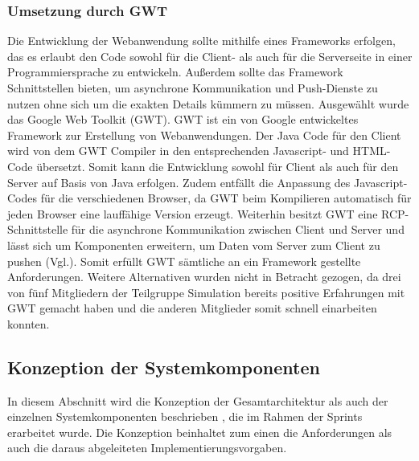 \subsubsection{Umsetzung durch GWT}
Die Entwicklung der Webanwendung sollte mithilfe eines Frameworks erfolgen, das es erlaubt den Code sowohl für die Client- als auch für die Serverseite in einer Programmiersprache zu entwickeln. Außerdem sollte das Framework Schnittstellen bieten, um asynchrone Kommunikation und Push-Dienste zu nutzen ohne sich um die exakten Details kümmern zu müssen. Ausgewählt wurde das Google Web Toolkit (GWT). GWT ist ein von Google entwickeltes Framework zur Erstellung von Webanwendungen. Der Java Code für den Client wird von dem GWT Compiler in den entsprechenden Javascript- und HTML-Code übersetzt. Somit kann die Entwicklung sowohl für Client als auch für den Server auf Basis von Java erfolgen. Zudem entfällt die Anpassung des Javascript-Codes für die verschiedenen Browser, da GWT beim Kompilieren automatisch für jeden Browser eine lauffähige Version erzeugt. Weiterhin besitzt GWT  eine RCP-Schnittstelle für die asynchrone Kommunikation zwischen Client und Server und lässt sich um Komponenten erweitern, um Daten vom Server zum Client zu pushen (Vgl.\cite{gwt}). Somit erfüllt GWT sämtliche an ein Framework gestellte Anforderungen. Weitere Alternativen wurden nicht in Betracht gezogen, da drei von fünf Mitgliedern der Teilgruppe Simulation bereits positive Erfahrungen mit GWT gemacht haben und die anderen Mitglieder somit schnell einarbeiten konnten. 
\subsection{Konzeption der Systemkomponenten}
In diesem Abschnitt wird die Konzeption der Gesamtarchitektur als auch der einzelnen Systemkomponenten beschrieben , die im Rahmen der Sprints erarbeitet wurde. Die Konzeption beinhaltet zum einen die Anforderungen als auch die daraus abgeleiteten Implementierungsvorgaben.
\newpage
